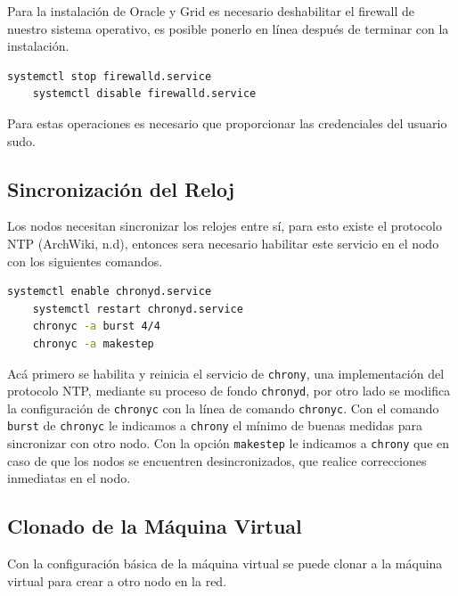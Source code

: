 \documentclass{article}
\begin{document}
Para la instalación de Oracle y Grid es necesario deshabilitar el firewall de nuestro sistema operativo, es posible ponerlo en línea después de terminar con la instalación.

\begin{lstlisting}[style=mystyle,language=bash]
	systemctl stop firewalld.service
	systemctl disable firewalld.service
\end{lstlisting}

Para estas operaciones es necesario que proporcionar las credenciales del usuario sudo.

\subsection{Sincronización del Reloj}

Los nodos necesitan sincronizar los relojes entre sí, para esto existe el protocolo NTP (ArchWiki, n.d), entonces sera necesario habilitar este servicio en el nodo con los siguientes comandos.

\begin{lstlisting}[style=mystyle,language=bash]
	systemctl enable chronyd.service
	systemctl restart chronyd.service
	chronyc -a burst 4/4
	chronyc -a makestep
\end{lstlisting}

Acá primero se habilita y reinicia el servicio de \texttt{chrony}, una implementación del protocolo NTP, mediante su proceso de fondo \texttt{chronyd}, por otro lado se modifica la configuración de \texttt{chronyc} con la línea de comando \texttt{chronyc}.
Con el comando \texttt{burst} de \texttt{chronyc} le indicamos a \texttt{chrony} el mínimo de buenas medidas para sincronizar con otro nodo. Con la opción \texttt{makestep} le indicamos a \texttt{chrony} que en caso de que los nodos se encuentren desincronizados, que realice correcciones inmediatas en el nodo.

\subsection{Clonado de la Máquina Virtual}

Con la configuración básica de la máquina virtual se puede clonar a la máquina virtual para crear a otro nodo en la red.
\end{document}

